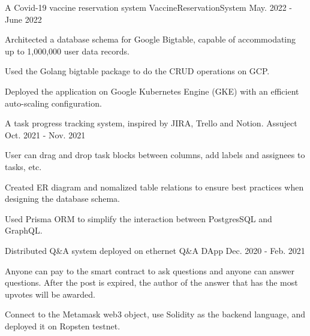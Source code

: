 

\begin{cventries}

  \cventry
  {A Covid-19 vaccine reservation system}
  {VaccineReservationSystem \href{https://github.com/MortalHappiness/VaccineReservationSystem}{\color{red}{[Github Link]}}}
  {}
  {May. 2022 - June 2022} %
  {
    \begin{cvitems} %
      \item {Architected a database schema for Google Bigtable, capable of accommodating up to 1,000,000 user data records.}
      \item {Used the Golang bigtable package to do the CRUD operations on GCP.}
      \item {Deployed the application on Google Kubernetes Engine (GKE) with an efficient auto-scaling configuration.}
    \end{cvitems}
  }

  \cventry
  {A task progress tracking system, inspired by JIRA, Trello and Notion.}
  {Assuject \href{https://github.com/MortalHappiness/DBM2021FallMidtermProject}{\color{red}{[Github Link]}}}
  {}
  {Oct. 2021 - Nov. 2021} %
  {
    \begin{cvitems} %
      \item {User can drag and drop task blocks between columns, add labels and assignees to tasks, etc.}
      \item {Created ER diagram and nomalized table relations to ensure best practices when designing the database schema.}
      \item {Used Prisma ORM to simplify the interaction between PostgresSQL and GraphQL.}
    \end{cvitems}
  }

  \cventry
  {Distributed Q\&A system deployed on ethernet}
  {Q\&A DApp \href{https://github.com/MortalHappiness/NMLab2020Fall-Final}{\color{red}{[Github Link]}}}
  {}
  {Dec. 2020 - Feb. 2021} %
  {
    \begin{cvitems} %
      \item {Anyone can pay to the smart contract to ask questions and anyone can answer questions. After the post is expired, the author of the answer that has the most upvotes will be awarded.}
      \item {Connect to the Metamask web3 object, use Solidity as the backend language, and deployed it on Ropsten testnet.}
    \end{cvitems}
  }


\end{cventries}
